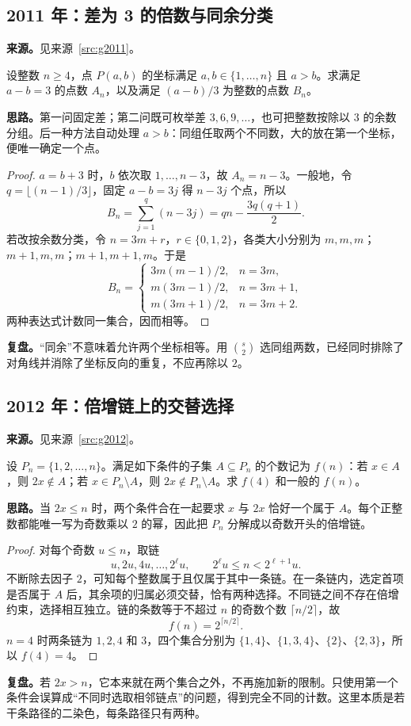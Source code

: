 \documentclass[UTF8]{ctexart}
\begin{document}
\subsection{2011 年：差为 3 的倍数与同余分类}\label{sec:g2011}
\textbf{来源。}见来源~\ref{src:g2011}。
\begin{example}[题意重述]
设整数 $n\geq4$，点 $P(a,b)$ 的坐标满足 $a,b\in\{1,\ldots,n\}$ 且 $a>b$。求满足 $a-b=3$ 的点数 $A_n$，以及满足 $(a-b)/3$ 为整数的点数 $B_n$。
\end{example}
\textbf{思路。}第一问固定差；第二问既可枚举差 $3,6,9,\ldots$，也可把整数按除以 $3$ 的余数分组。后一种方法自动处理 $a>b$：同组任取两个不同数，大的放在第一个坐标，便唯一确定一个点。
\begin{proof}
$a=b+3$ 时，$b$ 依次取 $1,\ldots,n-3$，故 $A_n=n-3$。一般地，令 $q=\lfloor(n-1)/3\rfloor$，固定 $a-b=3j$ 得 $n-3j$ 个点，所以
\[
B_n=\sum_{j=1}^{q}(n-3j)=qn-\frac{3q(q+1)}2.
\]
若改按余数分类，令 $n=3m+r$，$r\in\{0,1,2\}$，各类大小分别为 $m,m,m$；$m+1,m,m$；$m+1,m+1,m$。于是
\[
B_n=\begin{cases}
3m(m-1)/2,&n=3m,\\
m(3m-1)/2,&n=3m+1,\\
m(3m+1)/2,&n=3m+2.
\end{cases}
\]
两种表达式计数同一集合，因而相等。
\end{proof}
\textbf{复盘。}“同余”不意味着允许两个坐标相等。用 $\binom{s}{2}$ 选同组两数，已经同时排除了对角线并消除了坐标反向的重复，不应再除以 $2$。

\subsection{2012 年：倍增链上的交替选择}\label{sec:g2012}
\textbf{来源。}见来源~\ref{src:g2012}。
\begin{example}[题意重述]
设 $P_n=\{1,2,\ldots,n\}$。满足如下条件的子集 $A\subseteq P_n$ 的个数记为 $f(n)$：若 $x\in A$，则 $2x\notin A$；若 $x\in P_n\setminus A$，则 $2x\notin P_n\setminus A$。求 $f(4)$ 和一般的 $f(n)$。
\end{example}
\textbf{思路。}当 $2x\leq n$ 时，两个条件合在一起要求 $x$ 与 $2x$ 恰好一个属于 $A$。每个正整数都能唯一写为奇数乘以 $2$ 的幂，因此把 $P_n$ 分解成以奇数开头的倍增链。
\begin{proof}
对每个奇数 $u\leq n$，取链
\[
u,2u,4u,\ldots,2^{\ell}u,
\qquad 2^{\ell}u\leq n<2^{\ell+1}u.
\]
不断除去因子 $2$，可知每个整数属于且仅属于其中一条链。在一条链内，选定首项是否属于 $A$ 后，其余项的归属必须交替，恰有两种选择。不同链之间不存在倍增约束，选择相互独立。链的条数等于不超过 $n$ 的奇数个数 $\lceil n/2\rceil$，故
\[
\boxed{f(n)=2^{\lceil n/2\rceil}}.
\]
$n=4$ 时两条链为 $1,2,4$ 和 $3$，四个集合分别为 $\{1,4\}$、$\{1,3,4\}$、$\{2\}$、$\{2,3\}$，所以 $f(4)=4$。
\end{proof}
\textbf{复盘。}若 $2x>n$，它本来就在两个集合之外，不再施加新的限制。只使用第一个条件会误算成“不同时选取相邻链点”的问题，得到完全不同的计数。这里本质是若干条路径的二染色，每条路径只有两种。
\end{document}
